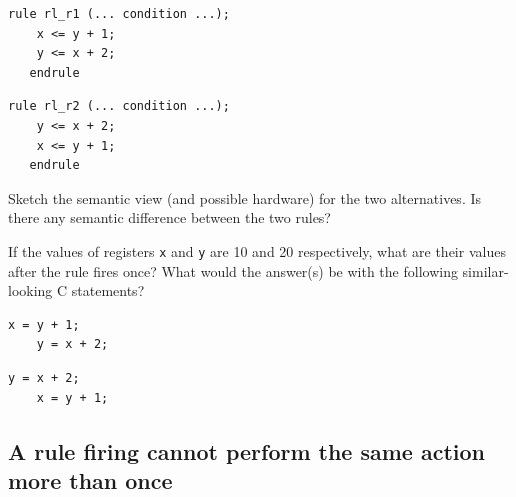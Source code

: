 \begin{center}
\begin{minipage}{2.5in}
 {\footnotesize
 \begin{Verbatim}[frame=single, label=BSV]
   rule rl_r1 (... condition ...);
    x <= y + 1;
    y <= x + 2;
   endrule
 \end{Verbatim}
 }
\end{minipage}
\hmm
\begin{minipage}{2.5in}
 {\footnotesize
 \begin{Verbatim}[frame=single,label=BSV]
   rule rl_r2 (... condition ...);
    y <= x + 2;
    x <= y + 1;
   endrule
 \end{Verbatim}
 }
\end{minipage}
\end{center}

\vspace{1ex}

Sketch the semantic view (and possible hardware) for the two
alternatives.  Is there any semantic difference between the two rules?

\vspace{1ex}

If the values of registers \verb|x| and \verb|y| are 10 and 20
respectively, what are their values after the rule fires once?  What
would the answer(s) be with the following similar-looking C
statements?

\begin{center}
\begin{minipage}{2.5in}
 {\footnotesize
 \begin{Verbatim}[frame=single, label=C]
    x = y + 1;
    y = x + 2;
 \end{Verbatim}
 }
\end{minipage}
\hmm
\begin{minipage}{2.5in}
 {\footnotesize
 \begin{Verbatim}[frame=single, label=C]
    y = x + 2;
    x = y + 1;
 \end{Verbatim}
 }
\end{minipage}
\end{center}

\Endexercise


\subsection{A rule firing cannot perform the same action more than once}

